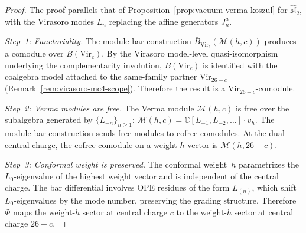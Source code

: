 \begin{proof}
The proof parallels that of
Proposition~\ref{prop:vacuum-verma-koszul} for $\widehat{\mathfrak{sl}}_2$,
with the Virasoro modes $L_n$ replacing the affine generators $J^a_n$.

\emph{Step~1: Functoriality.}
The module bar construction $\bar{B}_{\mathrm{Vir}_c}(\mathcal{M}(h,c))$
produces a comodule over $\bar{B}(\mathrm{Vir}_c)$.  By the
Virasoro model-level quasi-isomorphism underlying the complementarity
involution, $\bar{B}(\mathrm{Vir}_c)$ is identified with the coalgebra
  model attached to the same-family partner $\mathrm{Vir}_{26-c}$
  (Remark~\ref{rem:virasoro-mc4-scope}).
  Therefore the result is a
  $\mathrm{Vir}_{26-c}$-comodule.

\emph{Step~2: Verma modules are free.}
The Verma module $\mathcal{M}(h,c)$ is free over the subalgebra
generated by $\{L_{-n}\}_{n \geq 1}$:
$\mathcal{M}(h,c) = \mathbb{C}[L_{-1}, L_{-2}, \ldots] \cdot v_h$.
The module bar construction sends free modules to cofree comodules.
At the dual central charge, the cofree comodule on a
weight-$h$ vector is $\mathcal{M}(h, 26-c)$.

\emph{Step~3: Conformal weight is preserved.}
The conformal weight~$h$ parametrizes the $L_0$-eigenvalue of the
highest weight vector and is independent of the central charge.
The bar differential involves OPE residues of the form
$L_{(n)}$, which shift $L_0$-eigenvalues by the mode number,
preserving the grading structure.  Therefore $\Phi$ maps the
weight-$h$ sector at central charge $c$ to the weight-$h$ sector
at central charge $26-c$.
\end{proof}

